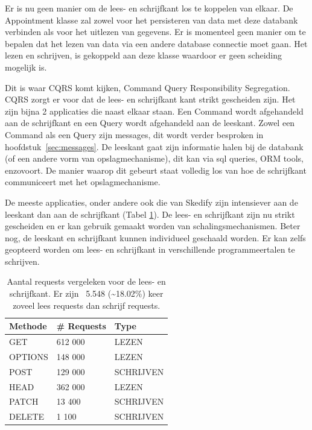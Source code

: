 
Er is nu geen manier om de lees- en schrijfkant los te koppelen van elkaar. De Appointment klasse zal zowel voor het persisteren van data met deze databank verbinden als voor het uitlezen van gegevens. Er is momenteel geen manier om te bepalen dat het lezen van data via een andere database connectie moet gaan. Het lezen en schrijven, is gekoppeld aan deze klasse waardoor er geen scheiding mogelijk is.

Dit is waar CQRS komt kijken, Command Query Responsibility Segregation. CQRS zorgt er voor dat de lees- en schrijfkant kant strikt gescheiden zijn. Het zijn bijna 2 applicaties die naast elkaar staan. Een Command wordt afgehandeld aan de schrijfkant en een Query wordt afgehandeld aan de leeskant. Zowel een Command als een Query zijn messages, dit wordt verder besproken in hoofdstuk~\ref{sec:messages}. De leeskant gaat zijn informatie halen bij de databank (of een andere vorm van opslagmechanisme), dit kan via sql queries, ORM tools, enzovoort. De manier waarop dit gebeurt staat volledig los van hoe de schrijfkant communiceert met het opslagmechanisme. 

De meeste applicaties, onder andere ook die van Skedify zijn intensiever aan de leeskant dan aan de schrijfkant (Tabel \ref{cqrs-read-writes}). De lees- en schrijfkant zijn nu strikt gescheiden en er kan gebruik gemaakt worden van schalingsmechanismen. Beter nog, de leeskant en schrijfkant kunnen individueel geschaald worden. Er kan zelfs geopteerd worden om lees- en schrijfkant in verschillende programmeertalen te schrijven.

\begin{table}[h]
\centering
\caption[Aantal requests vergeleken voor de lees- en schrijfkant.]{Aantal requests vergeleken voor de lees- en schrijfkant. Er zijn ~5.548 (\textasciitilde18.02\%) keer zoveel lees requests dan schrijf requests.}
\begin{tabular}{lll} \toprule
Methode & \# Requests & Type        \\ \midrule
GET     & 612 000     & LEZEN       \\
OPTIONS & 148 000     & LEZEN       \\
POST    & 129 000     & SCHRIJVEN   \\
HEAD    & 362 000     & LEZEN       \\
PATCH   & 13 400      & SCHRIJVEN   \\
DELETE  & 1 100       & SCHRIJVEN   \\ \bottomrule
\end{tabular}
\label{cqrs-read-writes}
\end{table}

